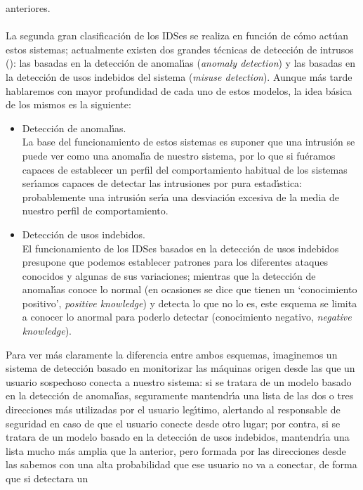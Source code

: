 anteriores.\\
\\La segunda gran clasificaci\'on de los IDSes se realiza en funci\'on de c\'omo
act\'uan estos sistemas; actualmente existen dos grandes t\'ecnicas de 
detecci\'on de intrusos (\cite{kn:sun96}): las basadas en la detecci\'on de 
anomal\'{\i}as ({\it anomaly detection}) y las basadas en la detecci\'on de 
usos indebidos del sistema ({\it misuse detection}). Aunque m\'as tarde 
hablaremos con mayor profundidad de cada uno de estos modelos, la idea b\'asica
de los mismos es la siguiente:
\begin{itemize}
\item Detecci\'on de anomal\'{\i}as.\\
La base del funcionamiento de estos sistemas es suponer que una intrusi\'on se
puede ver como una anomal\'{\i}a de nuestro sistema, por lo que si fu\'eramos
capaces de establecer un perfil del comportamiento habitual de los sistemas 
ser\'{\i}amos capaces de detectar las intrusiones por pura estad\'{\i}stica: 
probablemente una intrusi\'on ser\'{\i}a una desviaci\'on excesiva de la media 
de nuestro perfil de comportamiento.
\item Detecci\'on de usos indebidos.\\
El funcionamiento de los IDSes basados en la detecci\'on de usos indebidos 
presupone que podemos establecer patrones para los diferentes ataques conocidos
y algunas de sus variaciones; mientras que la detecci\'on de anomal\'{\i}as
conoce lo normal (en ocasiones se dice que tienen un `conocimiento positivo', 
{\it positive knowledge}) y detecta lo que no lo es, este esquema se limita a 
conocer lo anormal para poderlo detectar (conocimiento negativo, {\it negative
knowledge}).
\end{itemize}
Para ver m\'as claramente la diferencia entre ambos esquemas, imaginemos un 
sistema de detecci\'on basado en monitorizar las m\'aquinas origen desde las 
que un usuario sospechoso conecta a nuestro sistema: si se tratara de un modelo
basado en la detecci\'on de anomal\'{\i}as, seguramente mantendr\'{\i}a una
lista de las dos o tres direcciones m\'as utilizadas por el usuario 
leg\'{\i}timo, alertando al responsable de seguridad en caso de que el usuario
conecte desde otro lugar; por contra, si se tratara de un modelo basado en la
detecci\'on de usos indebidos, mantendr\'{\i}a una lista mucho m\'as amplia que
la anterior, pero formada por las direcciones desde las sabemos con una alta
probabilidad que ese usuario no va a conectar, de forma que si detectara un 
